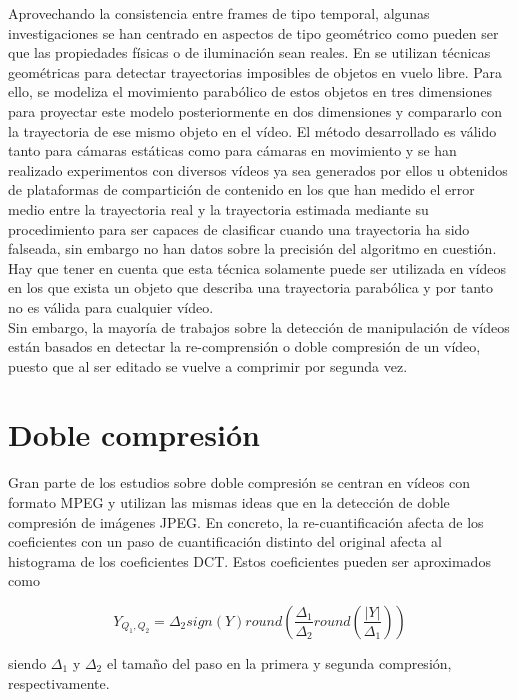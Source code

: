 Aprovechando la consistencia entre frames de tipo temporal, algunas investigaciones se han centrado en aspectos de tipo geométrico como pueden ser que las propiedades físicas o de iluminación sean reales. En \cite{conotter:2011} se utilizan técnicas geométricas para detectar trayectorias imposibles de objetos en vuelo libre. Para ello, se modeliza el movimiento parabólico de estos objetos en tres dimensiones para proyectar este modelo posteriormente en dos dimensiones y compararlo con la trayectoria de ese mismo objeto en el vídeo. El método desarrollado es válido tanto para cámaras estáticas como para cámaras en movimiento y se han realizado experimentos con diversos vídeos ya sea generados por ellos u obtenidos de plataformas de compartición de contenido en los que han medido el error medio entre la trayectoria real y la trayectoria estimada mediante su procedimiento para ser capaces de clasificar cuando una trayectoria ha sido falseada, sin embargo no han datos sobre la precisión del algoritmo en cuestión. Hay que tener en cuenta que esta técnica solamente puede ser utilizada en vídeos en los que exista un objeto que describa una trayectoria parabólica y por tanto no es válida para cualquier vídeo. \\

Sin embargo, la mayoría de trabajos sobre la detección de manipulación de vídeos están basados en detectar la re-comprensión o doble compresión de un vídeo, puesto que al ser editado se vuelve a comprimir por segunda vez. 

\section{Doble compresión}
Gran parte de los estudios sobre doble compresión se centran en vídeos con formato MPEG y utilizan las mismas ideas que en la detección de doble compresión de imágenes JPEG. En concreto, la re-cuantificación afecta de los coeficientes con un paso de cuantificación distinto del original afecta al histograma de los coeficientes DCT\cite{bestagini:2012}. Estos coeficientes pueden ser aproximados como\cite{fridrich:1998}

\begin{equation}
Y_{Q_1, Q_2} = \Delta_{2} sign(Y)round\left(\frac{\Delta_1}{\Delta_2}round\left(\frac{|Y|}{\Delta_1}\right)\right) \nonumber
\end{equation}

siendo $\Delta_1$ y $\Delta_2$ el tama\~no del paso en la primera y segunda compresión, respectivamente.

